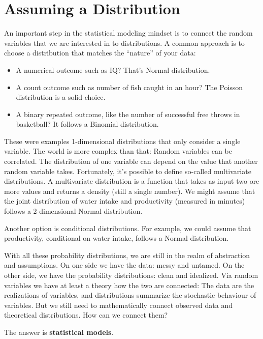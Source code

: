 \documentclass[
  10pt,
]{scrbook}
\providecommand{\tightlist}{%
  \setlength{\itemsep}{0pt}\setlength{\parskip}{0pt}}
\begin{document}
\hypertarget{assuming-a-distribution}{%
\section{Assuming a Distribution}\label{assuming-a-distribution}}

An important step in the statistical modeling mindset is to connect the random variables that we are interested in to distributions.
A common approach is to choose a distribution that matches the ``nature'' of your data:

\begin{itemize}
\tightlist
\item
  A numerical outcome such as IQ? That's Normal distribution.
\item
  A count outcome such as number of fish caught in an hour? The Poisson distribution is a solid choice.
\item
  A binary repeated outcome, like the number of successful free throws in basketball? It follows a Binomial distribution.
\end{itemize}

These were examples 1-dimensional distributions that only consider a single variable.
The world is more complex than that:
Random variables can be correlated.
The distribution of one variable can depend on the value that another random variable takes.
Fortunately, it's possible to define so-called multivariate distributions.
A multivariate distribution is a function that takes as input two ore more values and returns a density (still a single number).
We might assume that the joint distribution of water intake and productivity (measured in minutes) follows a 2-dimensional Normal distribution.

Another option is conditional distributions.
For example, we could assume that productivity, conditional on water intake, follows a Normal distribution.

With all these probability distributions, we are still in the realm of abstraction and assumptions.
On one side we have the data: messy and untamed.
On the other side, we have the probability distributions: clean and idealized.
Via random variables we have at least a theory how the two are connected:
The data are the realizations of variables, and distributions summarize the stochastic behaviour of variables.
But we still need to mathematically connect observed data and theoretical distributions.
How can we connect them?

The answer is \textbf{statistical models}.
\end{document}
